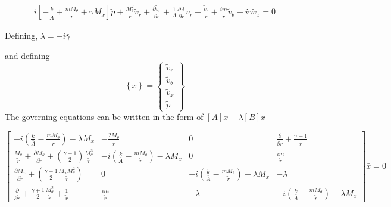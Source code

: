 \begin{align*}
	 \boxed{i \left[ -\frac{k}{\tilde{A}} + 
	 \frac{mM_{\theta}}{\tilde{r}} +
	 \bar{\gamma}M_x \right] \tilde{p} + 
	 \frac{M_{\theta}^2}{\tilde{r}}\tilde{v}_r + 
     \frac{\partial \tilde{v}_r}{\partial \tilde{r}} +
	 \frac{1}{A}\frac{\partial A}{\partial \tilde{r}}{v}_r+ 
 \frac{\tilde{v}_r  }{\tilde{r}} + \frac{im}{\tilde{r}}\tilde{v}_\theta + i \bar{\gamma} \tilde{v}_x = 0}
\end{align*}

Defining, $\lambda = -i \bar{\gamma} $ 

and defining 
\[ \left\{ \bar{x} \right\} =
\begin{Bmatrix}
    \tilde{v}_r \\
    \tilde{v}_{\theta} \\
    \tilde{v}_x \\
    \tilde{p}
\end{Bmatrix}
\]
The governing equations can be written in the form of $[A]{x} - \lambda [B]{x}$

\begin{equation*}
    \begin{bmatrix}
        -i \left( \frac{k}{\bar{A}} - \frac{mM_{\theta}}{\tilde{r}} \right) - \lambda M_x &
        -\frac{2 M_{\theta}}{\tilde{r}} &
        0 &
        \frac{\partial}{\partial \tilde{r}} + \frac{\gamma - 1}{\tilde{r}}\\ 
        \frac{ M_{\theta}}{\tilde{r}} + \frac{\partial M_{\theta}}{\partial \tilde{r}} + \left( \frac{\gamma - 1}{2} \right) \frac{M_{\theta}^3}{\tilde{r}}& 
        -i \left( \frac{k}{\bar{A}} - \frac{mM_{\theta}}{\tilde{r}} \right) - \lambda M_x & 
        0 &
        \frac{i m }{\tilde{r}}  \\
        \frac{\partial M_x}{\partial \tilde{r}} + \left( \frac{\gamma -1}{2}\frac{M_x M_{\theta}^2}{\tilde{r}}\right) & 0&
        -i \left( \frac{k}{\bar{A}} - \frac{mM_{\theta}}{\tilde{r}} \right) - \lambda M_x & -\lambda\\
        \frac{\partial}{\partial \tilde{r}} + \frac{\gamma +1}{2}\frac{M_{\theta}^2}{\tilde{r}} + \frac{1}{\tilde{r}} & \frac{im}{\tilde{r}} & -\lambda&  
        -i \left( \frac{k}{\bar{A}} - \frac{mM_{\theta}}{\tilde{r}} \right) - \lambda M_x 
    \end{bmatrix}\bar{x} = 0
\end{equation*}



